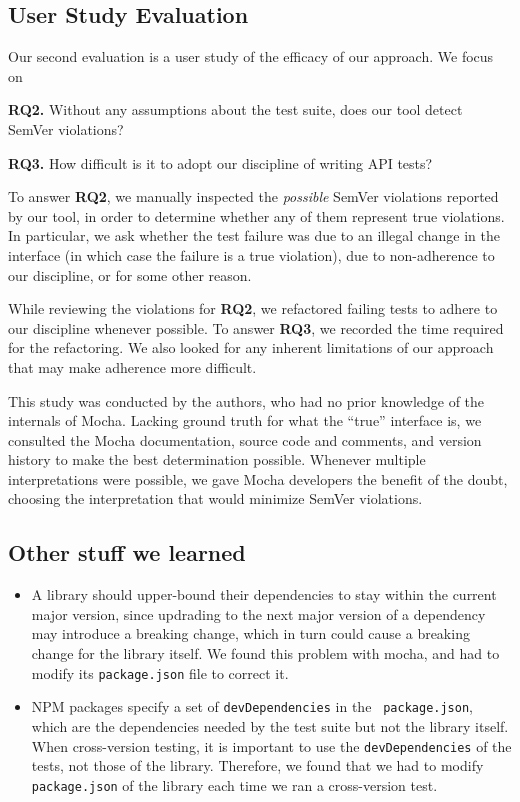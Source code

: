 \subsection{User Study Evaluation}
Our second evaluation is a user study of the efficacy of our
approach. We focus on 

{\bf RQ2.} Without any assumptions about the test suite, does our tool
detect SemVer violations?

{\bf RQ3.} How difficult is it to adopt our discipline of writing API
tests?

To answer {\bf RQ2}, we manually inspected the {\em possible\/} SemVer
violations reported by our tool, in order to determine whether any of
them represent true violations. In particular, we ask whether the test
failure was due to an illegal change in the interface (in which case
the failure is a true violation), due to non-adherence to our
discipline, or for some other reason.

While reviewing the violations for {\bf RQ2}, we refactored failing
tests to adhere to our discipline whenever possible. To answer {\bf
  RQ3}, we recorded the time required for the refactoring. We also
looked for any inherent limitations of our approach that may make
adherence more difficult.

This study was conducted by the authors, who had no prior knowledge of
the internals of Mocha. Lacking ground truth for what the ``true''
interface is, we consulted the Mocha documentation, source code and
comments, and version history to make the best determination
possible. Whenever multiple interpretations were possible, we gave
Mocha developers the benefit of the doubt, choosing the interpretation
that would minimize SemVer violations.

\subsection{Other stuff we learned}
\begin{itemize}
\item A library should upper-bound their dependencies to stay within
  the current major version, since updrading to the next major version
  of a dependency may introduce a breaking change, which in turn could
  cause a breaking change for the library itself. We found this
  problem with mocha, and had to modify its {\tt package.json} file to
  correct it.
\item NPM packages specify a set of {\tt devDependencies} in the {\tt
    package.json}, which are the dependencies needed by the test suite
  but not the library itself. When cross-version testing, it is
  important to use the {\tt devDependencies} of the tests, not those
  of the library. Therefore, we found that we had to modify {\tt
    package.json} of the library each time we ran a cross-version
  test.
\end{itemize}
